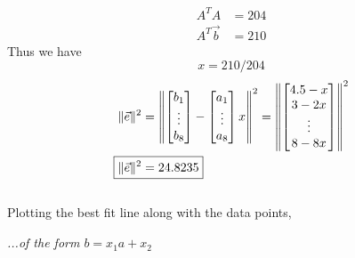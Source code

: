 \documentclass[letter]{article}
\newenvironment{menumerate}{\edef\backupindent{\the\parindent}
  \enumerate\setlength{\parindent}{\backupindent}}
  {\endenumerate}
\begin{document}
\begin{menumerate}
\begin{menumerate}
\begin{equation*}
\begin{aligned}
                A^TA &= 204\\
                A^T\vec{b} &= 210
            \end{aligned}
        \end{equation*}
        Thus we have
        \begin{equation*}
            \boxed{x = 210/204}
        \end{equation*}
        \begin{equation*}
        \begin{aligned}
            \|\vec{e}\|^2 &= \norm{\begin{bmatrix}
                b_1\\\vdots\\b_8
            \end{bmatrix} - \begin{bmatrix}
                a_1\\\vdots\\a_8
            \end{bmatrix} x}^2 = \norm{\begin{bmatrix}
                4.5-x\\3-2x\\\vdots\\8-8x
            \end{bmatrix}}^2\\
            \Aboxed{\|\vec{e}\|^2 &=24.8235}
        \end{aligned}
        \end{equation*}
        \\
        Plotting the best fit line along with the data points,
        \begin{center}
        \end{center}
        \item \emph{...of the form $b = x_1a+x_2$}\\

\end{menumerate}
\end{menumerate}
\end{document}
